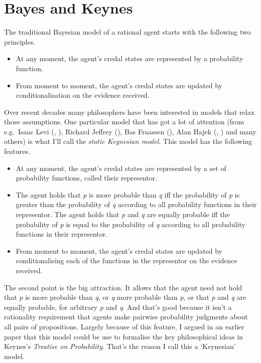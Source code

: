 \documentclass[
  11pt,
  letterpaper,
  DIV=11,
  numbers=noendperiod,
  oneside]{scrartcl}
\begin{document}
\section{Bayes and Keynes}\label{bayes-and-keynes}

The traditional Bayesian model of a rational agent starts with the
following two principles.

\begin{itemize}
\item
  At any moment, the agent's credal states are represented by a
  probability function.
\item
  From moment to moment, the agent's credal states are updated by
  conditionalisation on the evidence received.
\end{itemize}

Over recent decades many philosophers have been interested in models
that relax those assumptions. One particular model that has got a lot of
attention (from e.g.~Isaac Levi (,
), Richard Jeffrey
(), Bas Fraassen
(), Alan Hajek
(, ) and
many others) is what I'll call the \emph{static Keynesian model}. This
model has the following features.

\begin{itemize}
\item
  At any moment, the agent's credal states are represented by a set of
  probability functions, called their representor.
\item
  The agent holds that \emph{p} is more probable than \emph{q} iff the
  probability of \emph{p} is greater than the probability of \emph{q}
  according to all probability functions in their representor. The agent
  holds that \emph{p} and \emph{q} are equally probable iff the
  probability of \emph{p} is equal to the probability of \emph{q}
  according to all probability functions in their representor.
\item
  From moment to moment, the agent's credal states are updated by
  conditionalising each of the functions in the representor on the
  evidence received.
\end{itemize}

The second point is the big attraction. It allows that the agent need
not hold that \emph{p} is more probable than \emph{q}, or \emph{q} more
probable than \emph{p}, or that \emph{p} and \emph{q} are equally
probable, for arbitrary \emph{p} and \emph{q}. And that's good because
it isn't a rationality requirement that agents make pairwise probability
judgments about all pairs of propositions. Largely because of this
feature, I argued in an earlier paper that this model could be use to
formalise the key philosophical ideas in Keynes's \emph{Treatise on
Probability}. That's the reason I call this a `Keynesian' model.
\end{document}
